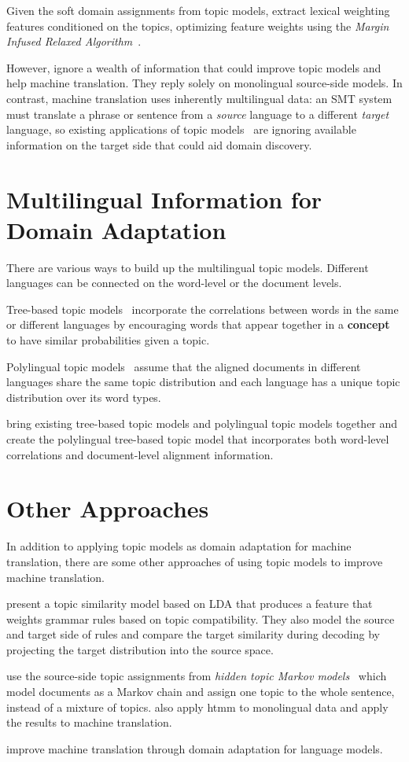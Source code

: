 Given the soft domain assignments from topic models, \citet{Eidelman-12} extract lexical weighting features conditioned on the topics, optimizing feature weights using the \emph{Margin Infused Relaxed Algorithm}~\citep[\textsc{mira}]{Crammer-06}. 

However, \citet{Eidelman-12} ignore a wealth of information that could improve topic models and help machine translation. They reply solely on monolingual source-side models. In contrast, machine translation uses inherently multilingual data: an SMT system must translate a phrase or sentence from a \emph{source} language to a different \emph{target} language, so existing applications of topic models~\citep{Eidelman-12} are ignoring available information on the target side that could aid domain discovery.

\section{Multilingual Information for Domain Adaptation}

There are various ways to build up the multilingual topic models. Different languages can be connected on the word-level or the document levels.

Tree-based topic models~\citep{boyd-graber-07,andrzejewski-09,Hu:Boyd-Graber:Satinoff-ur} incorporate the correlations between words in the same or different languages by encouraging words that appear together in a {\bf concept} to have similar probabilities given a topic.

Polylingual topic models~\citep{mimno-09} assume that the aligned documents in different languages share the same topic distribution and each language has a unique topic distribution over its word types.

\citet{hu-14} bring existing tree-based topic models and polylingual topic models together and create the polylingual tree-based topic model that incorporates both word-level correlations and document-level alignment information.

\section{Other Approaches}

In addition to applying topic models as domain adaptation for machine translation, there are some other approaches of using topic models to improve machine translation.

\citet{xiao-12} present a topic similarity model based on LDA that produces a feature that weights grammar rules based on topic compatibility. They also model the source and target side of rules and compare the target similarity during decoding by projecting the target distribution into the source space.

\citet{hasler-12} use the source-side topic assignments from \emph{hidden topic Markov models}~\citep[\textsc{htmm}]{gruber-07} which model documents as a Markov chain and assign one topic to the whole sentence, instead of a mixture of topics.  \citet{su-12} also apply htmm to monolingual data and apply the results to machine translation.

\citet{Bellegarda-04,wood-09} improve machine translation through domain adaptation for language models.
